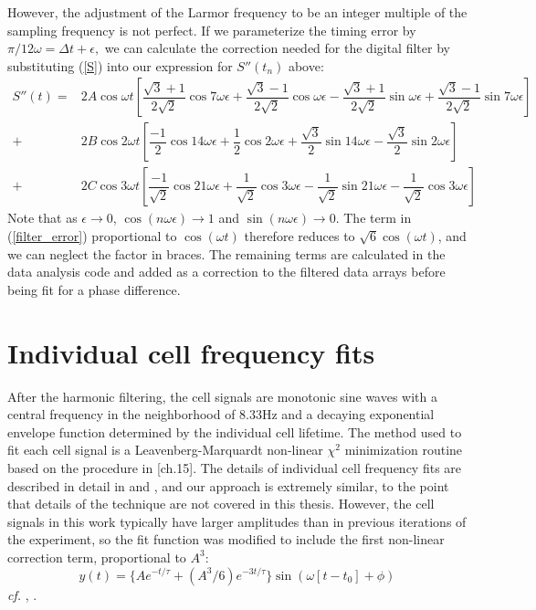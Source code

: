 \documentclass [10pt, twoside] {uwthesis}[2012/04/02]
\begin{document}
However, the adjustment of the Larmor frequency to be an integer multiple of the sampling frequency is not perfect. If we parameterize the timing error by $\pi/12\omega = \Delta t + \epsilon,$ we can calculate the correction needed for the digital filter by substituting (\ref{S}) into our expression for $S''(t_n)$ above:
\begin{align} \label{filter_error}
S''(t) = & 2A\cos \omega t \left[\dfrac{\sqrt{3}+1}{2\sqrt{2}}\cos 7\omega\epsilon + \dfrac{\sqrt{3}-1}{2\sqrt{2}}\cos \omega\epsilon - \dfrac{\sqrt{3}+1}{2\sqrt{2}} \sin\omega\epsilon + \dfrac{\sqrt{3}-1}{2\sqrt{2}}\sin 7\omega\epsilon\right] \\ 
+ & 2B\cos 2\omega t\left[\dfrac{-1}{2}\cos14\omega\epsilon + \dfrac{1}{2}\cos2\omega\epsilon + \dfrac{\sqrt{3}}{2}\sin 14\omega\epsilon - \dfrac{\sqrt{3}}{2}\sin 2\omega\epsilon\right] \\ 
+ & 2C\cos3\omega t \left[\dfrac{-1}{\sqrt{2}}\cos21\omega\epsilon + \dfrac{1}{\sqrt{2}}\cos3\omega\epsilon - \dfrac{1}{\sqrt{2}}\sin21\omega\epsilon - \dfrac{1}{\sqrt{2}}\cos3\omega\epsilon \right]
\end{align}
Note that as $\epsilon \rightarrow 0$, $\cos(n\omega\epsilon) \rightarrow 1$ and $\sin(n\omega\epsilon) \rightarrow 0$. The term in (\ref{filter_error}) proportional to $\cos(\omega t)$ therefore reduces to $\sqrt{6}\cos(\omega t)$, and we can neglect the factor in braces. The remaining terms are calculated in the data analysis code and added as a correction to the filtered data arrays before being fit for a phase difference.

\section{Individual cell frequency fits}
After the harmonic filtering, the cell signals are monotonic sine waves with a central frequency in the neighborhood of 8.33Hz and a decaying exponential envelope function determined by the individual cell lifetime. The method used to fit each cell signal is a Leavenberg-Marquardt non-linear $\chi^2$ minimization routine based on the procedure in \cite{NumericalRecipes}[ch.15]. The details of individual cell frequency fits are described in detail in \cite{Griffith} and \cite{Swallows}, and our approach is extremely similar, to the point that details of the technique are not covered in this thesis. However, the cell signals in this work typically have larger amplitudes than in previous iterations of the experiment, so the fit function was modified to include the first non-linear correction term, proportional to $A^3$:
\begin{equation}
y(t) = \lbrace A e^{-t/\tau} + (A^3/6)e^{-3t/\tau} \rbrace \sin(\omega [t-t_0] + \phi)
\end{equation}
\textit{cf.} \cite[eq. 4.7]{Swallows}, \cite[eq. 4.4]{Griffith}.
\end{document}
